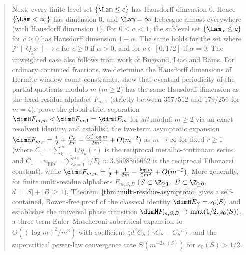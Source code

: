 \begin{abstract}
Next, every finite level set $\{\Lam\le c\}$ has Hausdorff dimension $0$.
Hence $\{\Lam<\infty\}$ has dimension $0$, and $\Lam=\infty$ Lebesgue-almost
everywhere (with Hausdorff dimension $1$). For $0\le\alpha<1$, the sublevel set $\{\Lam_\alpha\le c\}$ for $c\ge0$
has Hausdorff dimension $1-\alpha$. The same holds for the set where
$j^\alpha\|Q_jx\|\to c$ for $c\ge0$ if $\alpha>0$, and for
$c\in[0,1/2]$ if $\alpha=0$. The unweighted case also follows from work
of Bugeaud, Liao and Rams. For ordinary continued fractions,
we determine the Hausdorff dimensions of Hermite window-count constraints,
show that eventual periodicity of the partial quotients modulo $m$ ($m\ge2$) has
the same Hausdorff dimension as the fixed residue alphabet $F_{m,1}$ (strictly
between $357/512$ and $179/256$ for $m=4$), prove the global strict separation
$\dimH F_{m,m}<\dimH F_{m,1}=\dimH E_m$ for \emph{all} moduli $m\ge2$ via an
exact resolvent identity, and establish the two-term asymptotic expansion
$\dimH F_{m,r}=\frac12+\frac{C_r}{2m}-\frac{C_r^2\log m}{2m^2}+O(m^{-2})$ as
$m\to\infty$ for fixed $r\ge1$ (where $C_r=\sum_{k=1}^\infty 1/q_k(r)$ is the
reciprocal metallic-continuant series and $C_1=\psi_{\mathrm{Fib}}=\sum_{k=1}^\infty 1/F_k\approx3.3598856662$ is the reciprocal Fibonacci constant), while
$\dimH F_{m,m}=\frac12+\frac{1}{2m}-\frac{\log m}{2m^2}+O(m^{-2})$. More generally,
for finite multi-residue alphabets $F_{m,S,B}$ ($S\subset\Z_{\ge1}$,
$B\subset\Z_{\ge0}$, $d=|S|+|B|\ge1$), Theorem~\ref{thm:multi-residue-asymptotic}
gives a self-contained, Bowen-free proof of the classical identity
$\dimH E_S=s_0(S)$ and establishes the universal phase transition
$\dimH F_{m,S,B}\to\max(1/2,s_0(S))$, a three-term
Euler--Mascheroni subcritical expansion to $O((\log m)^2/m^3)$ with coefficient
$\frac12 d^2 C_S(\gamma C_S-C_S')$, and the supercritical power-law convergence
rate $\Theta(m^{-2s_0(S)})$ for $s_0(S)>1/2$.


\end{abstract}
